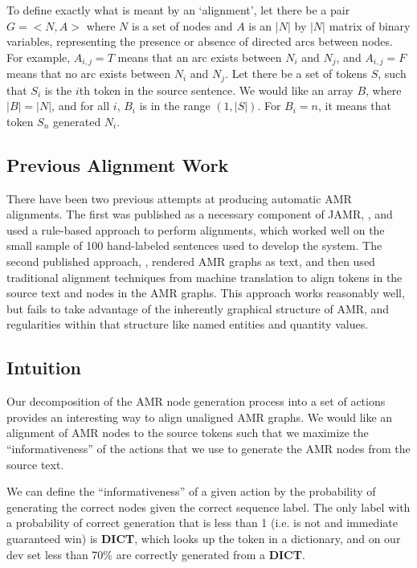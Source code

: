 \documentclass[11pt]{article}
\begin{document}
To define exactly what is meant by an `alignment', let there be a pair $G = <N,A>$ where $N$ is a set of nodes and $A$ is an $|N|$ by $|N|$ matrix of binary variables, representing the presence or absence of directed arcs between nodes. For example, $A_{i,j} = T$ means that an arc exists between $N_i$ and $N_j$, and $A_{i,j} = F$ means that no arc exists between $N_i$ and $N_j$. Let there be a set of tokens $S$, such that $S_i$ is the $i$th token in the source sentence. We would like an array $B$, where $|B| = |N|$, and for all $i$, $B_i$ is in the range $(1,|S|)$. For $B_i = n$, it means that token $S_n$ generated $N_i$.

\subsection{Previous Alignment Work}

There have been two previous attempts at producing automatic AMR alignments. The first was published as a necessary component of JAMR, \cite{Flanigan:14}, and used a rule-based approach to perform alignments, which worked well on the small sample of 100 hand-labeled sentences used to develop the system. The second published approach, , rendered AMR graphs as text, and then used traditional alignment techniques from machine translation to align tokens in the source text and nodes in the AMR graphs. This approach works reasonably well, but fails to take advantage of the inherently graphical structure of AMR, and regularities within that structure like named entities and quantity values.

\subsection{Intuition}

Our decomposition of the AMR node generation process into a set of actions provides an interesting way to align unaligned AMR graphs. We would like an alignment of AMR nodes to the source tokens such that we maximize the ``informativeness'' of the actions that we use to generate the AMR nodes from the source text.

We can define the ``informativeness'' of a given action by the probability of generating the correct nodes given the correct sequence label. The only label with a probability of correct generation that is less than 1 (i.e. is not and immediate guaranteed win) is \textbf{DICT}, which looks up the token in a dictionary, and on our dev set less than 70\% are correctly generated from a \textbf{DICT}.
\end{document}
